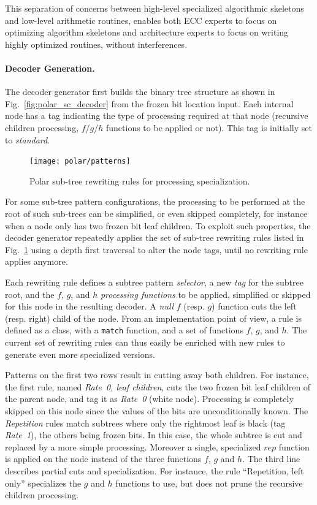 This separation of concerns between high-level specialized algorithmic skeletons
and low-level arithmetic routines, enables both ECC experts to focus on
optimizing algorithm skeletons and architecture experts to focus on writing
highly optimized routines, without interferences.

\paragraph{Decoder Generation.}

The decoder generator first builds the binary tree structure as shown in
Fig.~\ref{fig:polar_sc_decoder} from the frozen bit location input. Each
internal node has a tag indicating the type of processing required at that node
(recursive children processing, $f$/$g$/$h$ functions to be applied or not).
This tag is initially set to \emph{standard}.

\begin{figure}[htp]
  \centering
  \texttt{[image: polar/patterns]}
  \caption{Polar sub-tree rewriting rules for processing specialization.}
  \label{fig:polar_patterns}
\end{figure}

For some sub-tree pattern configurations, the processing to be performed at the
root of such sub-trees can be simplified, or even skipped completely, for
instance when a node only has two frozen bit leaf children. To exploit such
properties, the decoder generator repeatedly applies the set of sub-tree
rewriting rules listed in Fig.~\ref{fig:polar_patterns} using a depth first
traversal to alter the node tags, until no rewriting rule applies anymore.

Each rewriting rule defines a subtree pattern \emph{selector}, a new \emph{tag}
for the subtree root, and the $f$, $g$, and $h$ \emph{processing functions} to
be applied, simplified or skipped for this node in the resulting decoder. A
\emph{null} $f$ (resp. $g$) function cuts the left (resp. right) child of the
node. From an implementation point of view, a rule is defined as a class, with a
\verb|match| function, and a set of functions $f$, $g$, and $h$. The current
set of rewriting rules can thus easily be enriched with new rules to generate
even more specialized versions.

Patterns on the first two rows result in cutting away both children. For
instance, the first rule, named \emph{Rate~0, leaf children}, cuts the two
frozen bit leaf children of the parent node, and tag it as \emph{Rate~0} (white
node). Processing is completely skipped on this node since the values of the
bits are unconditionally known. The \emph{Repetition} rules match subtrees where
only the rightmost leaf is black (tag \emph{Rate~1}), the others being frozen
bits. In this case, the whole subtree is cut and replaced by a more simple
processing. Moreover a single, specialized $rep$ function is applied on the node
instead of the three functions $f$, $g$ and $h$. The third line describes
partial cuts and specialization. For instance, the rule ``Repetition, left
only'' specializes the $g$ and $h$ functions to use, but does not prune the
recursive children processing.

